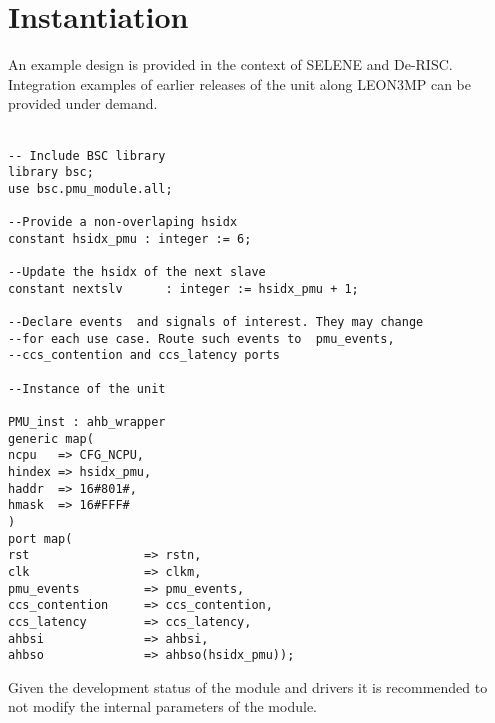 \section{Instantiation}
An example design is provided in the context of SELENE and De-RISC. Integration examples of earlier releases of the unit along LEON3MP can be provided under demand.\\
\\
\belowcaptionskip=-10pt
\begin{lstlisting}[label=ins-prot,caption=SafePMU instance example for gpp\_sys,style=vhdl]
-- Include BSC library
library bsc;
use bsc.pmu_module.all;

--Provide a non-overlaping hsidx
constant hsidx_pmu : integer := 6;

--Update the hsidx of the next slave
constant nextslv      : integer := hsidx_pmu + 1;

--Declare events  and signals of interest. They may change 
--for each use case. Route such events to  pmu_events,
--ccs_contention and ccs_latency ports

--Instance of the unit

PMU_inst : ahb_wrapper
generic map(
ncpu   => CFG_NCPU,
hindex => hsidx_pmu,
haddr  => 16#801#,
hmask  => 16#FFF#
)
port map(
rst                => rstn,
clk                => clkm,
pmu_events         => pmu_events,
ccs_contention     => ccs_contention,
ccs_latency        => ccs_latency,
ahbsi              => ahbsi,
ahbso              => ahbso(hsidx_pmu));

\end{lstlisting}
Given the development status of the module and drivers it is recommended to not modify the internal parameters of the module.\\



